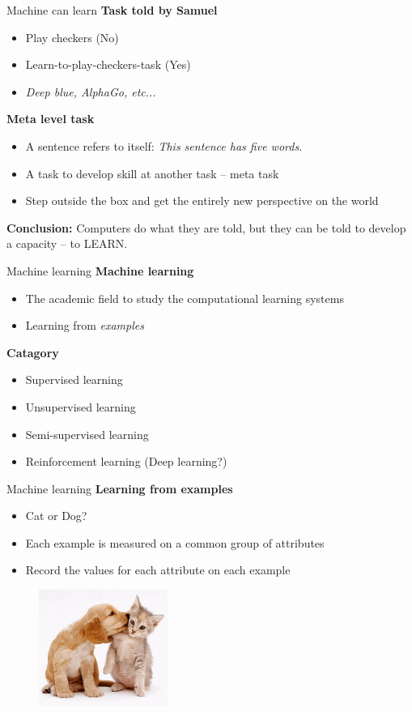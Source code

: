 \documentclass{beamer}
\begin{document}
\begin{frame}{Machine can learn}
\textbf{Task told by Samuel}
\begin{itemize}
\item Play checkers (No)
\item Learn-to-play-checkers-task (Yes)
\item {\it Deep blue, AlphaGo, etc...}
\end{itemize}
\vspace{6pt}
\textbf{Meta level task}
\begin{itemize}
\item A sentence refers to itself: {\it This sentence has five words.}
\item A task to develop skill at another task -- meta task 
\item Step outside the box and get the entirely new perspective on the world
\end{itemize}
\vspace{6pt}
\textbf{Conclusion:} Computers do what they are told, but they can be told to develop a capacity -- to LEARN.
\end{frame}


\begin{frame}{Machine learning}
\textbf{Machine learning}
\begin{itemize}
\item The academic field to study the computational learning systems
\item Learning from {\it examples}
\end{itemize}
\textbf{Catagory}
\begin{itemize}
\item Supervised learning
\item Unsupervised learning
\item Semi-supervised learning
\item Reinforcement learning (Deep learning?)
\end{itemize}
\end{frame}

\begin{frame}{Machine learning}
\textbf{Learning from examples}
\begin{itemize}
\item Cat or Dog? 
\item Each example is measured on a common group of attributes
\item Record the values for each attribute on each example
\end{itemize}
\begin{figure}
\centering
\includegraphics[width=4.2cm]{ep2.png}
\end{figure}
\end{frame}
\end{document}
